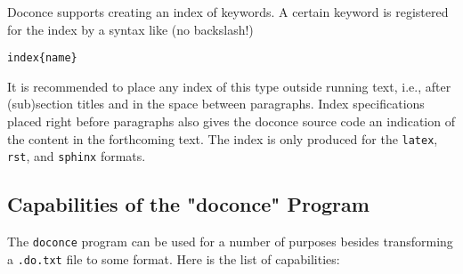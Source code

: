 \documentclass[%
oneside,                 %
final,                   %
10pt]{article}
\begin{document}
Doconce supports creating an index of keywords. A certain keyword
is registered for the index by a syntax like (no
backslash!)
\begin{Verbatim}[numbers=none,fontsize=\fontsize{9pt}{9pt},baselinestretch=0.85,xleftmargin=0mm]
index{name}
\end{Verbatim}
It is recommended to place any index of this type outside
running text, i.e., after (sub)section titles and in the space between
paragraphs. Index specifications placed right before paragraphs also
gives the doconce source code an indication of the content in the
forthcoming text. The index is only produced for the \Verb!latex!, \Verb!rst!, and
\Verb!sphinx! formats.

\subsection{Capabilities of the "doconce" Program}

The \Verb!doconce! program can be used for a number of purposes besides
transforming a \Verb!.do.txt! file to some format. Here is the
list of capabilities:
\end{document}
